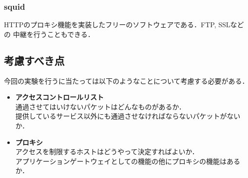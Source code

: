 \subsubsection*{squid}
HTTPのプロキシ機能を実装したフリーのソフトウェアである．FTP, SSLなどの
中継を行うこともできる．

\subsection*{考慮すべき点}
今回の実験を行うに当たっては以下のようなことについて考慮する必要がある．
\begin{itemize}
  \item \textbf{アクセスコントロールリスト}\\
         通過させてはいけないパケットはどんなものがあるか．\\
         提供しているサービス以外にも通過させなければならないパケットがないか．
  \item \textbf{プロキシ}\\
         アクセスを制限するホストはどうやって決定すればよいか．\\
         アプリケーションゲートウェイとしての機能の他にプロキシの機能はあるか．
\end{itemize}
